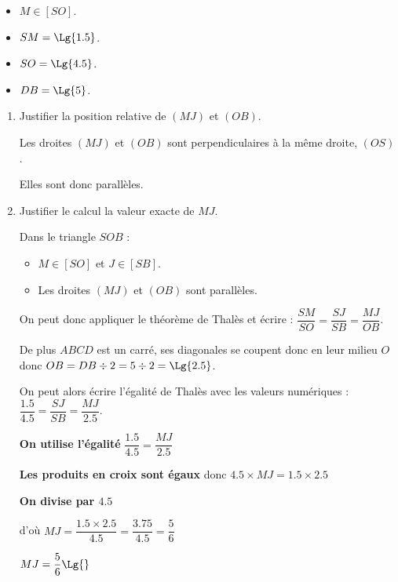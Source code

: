     \begin{minipage}{0.45\linewidth}
        \begin{itemize}
            \item $M \in [SO]$.
            \item $SM=\Lg{1.5}$.
            \item $SO=\Lg{4.5}$.
            \item $DB=\Lg{5}$.
        \end{itemize}
    \end{minipage}

    \begin{enumerate}
        \item Justifier la position relative de $(MJ)$ et $(OB)$.

        {\color{red} Les droites $(MJ)$ et $(OB)$ sont perpendiculaires à la même droite, $(OS)$.

        Elles sont donc parallèles.
        }
        \item Justifier le calcul la valeur exacte de $MJ$.

        {\color{red} Dans le triangle $SOB$ :
        \begin{itemize}
            \item $M \in [SO]$ et $J \in [SB]$.
            \item Les droites $(MJ)$ et $(OB)$ sont parallèles.
        \end{itemize}
        On peut donc appliquer le théorème de Thalès et écrire : $\dfrac{SM}{SO}=\dfrac{SJ}{SB}=\dfrac{MJ}{OB}$.

        \smallskip
        De plus $ABCD$ est un carré, ses diagonales se coupent donc en leur milieu $O$ donc $OB=DB\div 2 = 5\div 2 = \Lg{2.5}$.

        On peut alors écrire l'égalité de Thalès avec les valeurs numériques : $\dfrac{\num{1.5}}{\num{4.5}}=\dfrac{SJ}{SB}=\dfrac{MJ}{\num{2.5}}$.

        \textbf{On utilise l'égalité} $\dfrac{\num{1.5}}{\num{4.5}}=\dfrac{MJ}{\num{2.5}}$

        \textbf{Les produits en croix sont égaux} donc $\num{4.5}\times MJ=\num{1.5}\times \num{2.5}$

        \textbf{On divise par $\num{4.5}$}

        \smallskip
        d'où $MJ=\dfrac{\num{1.5}\times \num{2.5}}{\num{4.5}}=\dfrac{\num{3.75}}{\num{4.5}}=\dfrac{5}{6}$

        $MJ=\dfrac{5}{6} \Lg{}$
        }
    \end{enumerate}
